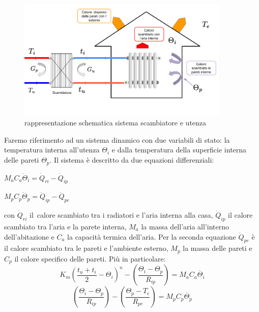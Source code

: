 \documentclass[laurea,oneside,11pt]{USiena_tesiLM}
\begin{document}
\begin{figure}[h]
\begin{center}
\includegraphics[width=0.9\textwidth]{figure/scamb_utenza} %
\caption{rappresentazione schematica sistema scambiatore e utenza}
\label{fig:scamb_utenza}
\end{center}
\end{figure}

Faremo riferimento ad un sistema dinamico con due variabili di stato: la temperatura interna all'utenza  $\Theta_i$  e dalla temperatura della superficie interna delle pareti  $\Theta_p$. Il sistema è  descritto  da due equazioni differenziali:
\begin{center}
$M_aC_a \dot{\Theta}_i = \dot{Q}_{ri} - \dot{Q}_{ip}$ 
\end{center}
\begin{center}
$M_pC_p \dot{\Theta}_p = \dot{Q}_{ip} - \dot{Q}_{pe}$
\end{center}
con $\dot{Q}_{ri}$ il\ calore scambiato tra i radiatori e l'aria interna alla casa, $\dot{Q}_{ip}$ il calore scambiato tra l'aria e la parete interna, $M_a$ la massa dell'aria all'interno dell'abitazione e $C_a$ la capacità termica dell'aria. Per la seconda equazione $ \dot{Q}_{pe}$ è il calore scambiato tra le pareti e l'ambiente esterno, $M_p$ la massa delle pareti e $C_p$ il calore specifico delle pareti.
Più in particolare:
\begin{equation}
K_m\left(\frac{t_u + t_i}{2} - \Theta_{i}\right)^n - \left(\frac{\Theta_{i} - \Theta_p}{R_{ip}}\right) = M_aC_a \dot{\Theta_i}
\end{equation}
\begin{equation}
\left(\frac{\Theta_{i} - \Theta_p}{R_{ip}}\right) - \left(\frac{\Theta_{p} - T_e}{R_{pe}}\right) = M_pC_p \dot{\Theta_p}
\end{equation}
\end{document}
